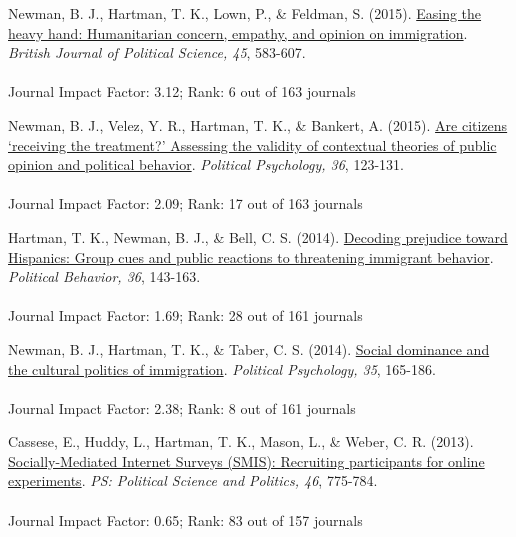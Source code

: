 \documentclass[12pt]{article}
\begin{document}
\begin{bibenum}
    \item Newman, B. J., {Hartman, T. K.}, Lown, P., \& Feldman, S. (2015). 
          \href{http://tkhartman.staff.shef.ac.uk/_content/documents/Newman.Hartman.Feldman.Lown.2015.British.Journal.of.Political.Science.pdf}
          {Easing the heavy hand: Humanitarian concern, empathy, and 
          opinion on immigration}. 
          \emph{British Journal of Political Science, 45}, 583-607.\\
          \\
          Journal Impact Factor: 3.12; Rank: 6 out of 163 journals
           
    \item Newman, B. J., Velez, Y. R., {Hartman, T. K.}, \& Bankert, A. (2015). 
          \href{http://tkhartman.staff.shef.ac.uk/_content/documents/Newman.Velez.Hartman.Bankert.2015.Political.Psychology.pdf}
          {Are citizens `receiving the treatment?' Assessing the validity 
          of contextual theories of public opinion and political behavior}. 
          \emph{Political Psychology, 36}, 123-131.\\
          \\
          Journal Impact Factor: 2.09; Rank: 17 out of 163 journals

    \item {Hartman, T. K.}, Newman, B. J., \& Bell, C. S. (2014). 
          \href{http://tkhartman.staff.shef.ac.uk/_content/documents/Hartman.Newman.Bell.2014.Political.Behavior.pdf}
          {Decoding prejudice toward Hispanics: 
			Group cues and public reactions to threatening immigrant behavior}.
          \emph{Political Behavior, 36}, 143-163.\\
          \\
          Journal Impact Factor: 1.69; Rank: 28 out of 161 journals
  
    \item Newman, B. J., {Hartman, T. K.}, \& Taber, C. S. (2014). 
          \href{http://tkhartman.staff.shef.ac.uk/_content/documents/Newman.Hartman.Taber.2014.Political.Psychology.pdf}
          {Social dominance and the cultural politics of immigration}. 
          \emph{Political Psychology, 35}, 165-186.\\
          \\
          Journal Impact Factor: 2.38; Rank: 8 out of 161 journals

    \item Cassese, E., Huddy, L., {Hartman, T. K.}, Mason, L., 
          \& Weber, C. R. (2013). 
          \href{http://tkhartman.staff.shef.ac.uk/_content/documents/Cassese.Huddy.Hartman.Mason.Weber.2013.PS.pdf}
          {Socially-Mediated Internet Surveys (SMIS): 
          Recruiting participants for online experiments}. 
          \emph{PS: Political Science and Politics, 46}, 775-784.\\
          \\
          Journal Impact Factor: 0.65; Rank: 83 out of 157 journals


\end{bibenum}
\end{document}
